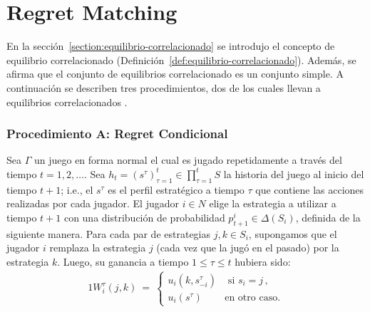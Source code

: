 \chapter{Regret Matching}
\label{chapter:regret-matching}

\newcommand{\graphicsRM}[2]{
\begin{figure}[h]
    \resizebox{\textwidth}{!}{
    \texttt{[image: graficas/regret-matching/\#1/procedimiento-A.png]}
    \texttt{[image: graficas/regret-matching/\#1/procedimiento-B.png]} 
    \texttt{[image: graficas/regret-matching/\#1/procedimiento-C.png]}
    }
    \caption{Gráficas del \textit{regret} con respecto al número de iteraciones del juego #2.}
    \label{fig:regret-rm-#1}
\end{figure}
}

En la sección~\ref{section:equilibrio-correlacionado} se introdujo el concepto de equilibrio correlacionado (Definición~\ref{def:equilibrio-correlacionado}). Además, se afirma que el conjunto de equilibrios correlacionado es un conjunto simple. A continuación se describen tres procedimientos, dos de los cuales llevan a equilibrios correlacionados \cite{bib:correlated-equilibrium}.

\subsection*{Procedimiento A: Regret Condicional}

Sea $\Gamma$ un juego en forma normal el cual es jugado repetidamente a través del tiempo $t = 1, 2, \ldots $. 
Sea $h_t = (s^\tau)_{\tau = 1}^t \in \prod_{\tau = 1}^{t} S$ la historia del juego al inicio del tiempo $t+1$; i.e., el $s^\tau$ es el perfil estratégico a tiempo $\tau$ que contiene las acciones realizadas por cada jugador. El jugador $i \in N$ elige la estrategia a utilizar a tiempo $t+1$ con una distribución de probabilidad $p_{t+1}^i \in \Delta(S_i)$, definida de la siguiente manera. Para cada par de estrategias $j, k \in S_i$, supongamos que el jugador $i$ remplaza la estrategia $j$ (cada vez que la jugó en el pasado) por la estrategia $k$. Luego, su ganancia a tiempo $1\leq \tau \leq t$ hubiera sido:
\begin{alignat}{1}
W_i^{\tau}(j,k)\ =\ 
\begin{cases}
u_i(k, s_{-i}^{\tau}) &\text{ si } s_i = j \,, \\
u_i(s^\tau) & \text{en otro caso.} 
\end{cases}
\end{alignat}

